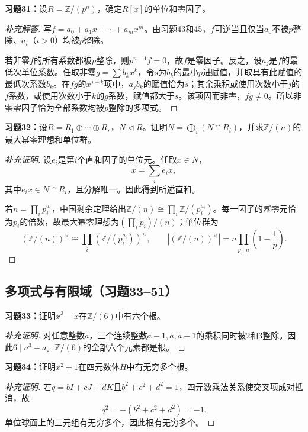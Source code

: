 \begin{problem}
\textbf{习题31：}设$R=\mathbb Z/(p^n)$，确定$R[x]$的单位和零因子。
\end{problem}
\begin{proof}[补充解答]
写$f=a_0+a_1x+\cdots+a_mx^m$。由习题43和45，$f$可逆当且仅当$a_0$不被$p$整除、$a_i$（$i>0$）均被$p$整除。

若非零$f$的所有系数都被$p$整除，则$p^{n-1}f=0$，故$f$是零因子。反之，设$a_j$是$f$的最低次单位系数。任取非零$g=\sum b_kx^k$，令$s$为$b_k$的最小$p$进赋值，并取具有此赋值的最低次系数$b_k$。在$fg$的$x^{j+k}$项中，$a_jb_k$的赋值恰为$s$；其余乘积或使用次数小于$j$的$f$系数，或使用次数小于$k$的$g$系数，赋值都大于$s$。该项因而非零，$fg\ne0$。所以非零零因子恰为全部系数均被$p$整除的多项式。
\end{proof}

\begin{problem}
\textbf{习题32：}设$R=R_1\oplus\cdots\oplus R_r$，$N\lhd R$。证明$N=\bigoplus_i(N\cap R_i)$，并求$\mathbb Z/(n)$的最大幂零理想和单位群。
\end{problem}
\begin{proof}[补充证明]
设$e_i$是第$i$个直和因子的单位元。任取$x\in N$，
\[
x=\sum_i e_ix,
\]
其中$e_ix\in N\cap R_i$，且分解唯一。因此得到所述直和。

若$n=\prod_i p_i^{a_i}$，中国剩余定理给出$\mathbb Z/(n)\cong\prod_i\mathbb Z/(p_i^{a_i})$。每一因子的幂零元恰为$p_i$的倍数，故最大幂零理想为$(\prod_i p_i)/(n)$；单位群为
\[
(\mathbb Z/(n))^\times\cong\prod_i(\mathbb Z/(p_i^{a_i}))^\times,
\qquad |(\mathbb Z/(n))^\times|=n\prod_{p\mid n}\left(1-\frac1p\right).
\]
\end{proof}

\subsection*{多项式与有限域（习题33--51）}

\begin{problem}
\textbf{习题33：}证明$x^3-x$在$\mathbb Z/(6)$中有六个根。
\end{problem}
\begin{proof}[补充证明]
对任意整数$a$，三个连续整数$a-1,a,a+1$的乘积同时被$2$和$3$整除。因此$6\mid a^3-a$。$\mathbb Z/(6)$的全部六个元素都是根。
\end{proof}

\begin{problem}
\textbf{习题34：}证明$x^2+1$在四元数体$H$中有无穷多个根。
\end{problem}
\begin{proof}[补充证明]
若$q=bI+cJ+dK$且$b^2+c^2+d^2=1$，四元数乘法关系使交叉项成对抵消，故
\[
q^2=-(b^2+c^2+d^2)=-1.
\]
单位球面上的三元组有无穷多个，因此根有无穷多个。
\end{proof}

